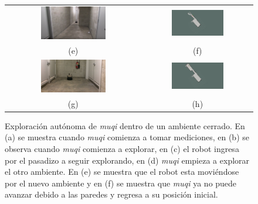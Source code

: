 \begin{figure}
\begin{tabular}{cc}
    \includegraphics[width=0.50\textwidth]{images/KobukiSotano4.png}&
    \includegraphics[width=0.50\textwidth]{images/Slam_3.PNG}\\
    (e)&(f)\\
    \includegraphics[width=0.50\textwidth]{images/KobukiSotano6.JPG}&
    \includegraphics[width=0.50\textwidth]{images/Slam_5.PNG}\\
    (g)&(h)
  \end{tabular}
  \captionsetup{font=footnotesize}
  \caption{Exploración autónoma de \textit{muqi} dentro de un ambiente 
  cerrado. En (a) se muestra cuando \textit{muqi} comienza a tomar 
  mediciones, en (b) se observa cuando \textit{muqi} comienza a explorar, 
  en (c) el robot ingresa por el pasadizo a seguir explorando, en (d) 
  \textit{muqi} empieza a explorar el otro ambiente. En (e) se muestra que 
  el robot esta moviéndose por el nuevo ambiente y en (f) se muestra que 
  \textit{muqi} ya no puede avanzar debido a las paredes y regresa a su 
  posición inicial.}
  \label{fig:exploracionMuqi}
\end{figure}


